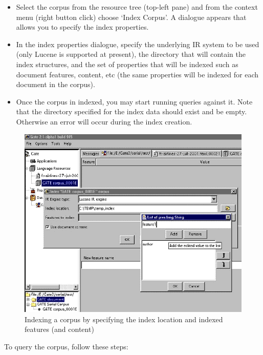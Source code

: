 \begin{itemize}
%
\item
Select the corpus from the resource tree (top-left pane) and from the
context menu (right button click) choose `Index Corpus'. A dialogue
appears that allows you to specify the index properties.
%
\item
In the index properties dialogue, specify the underlying IR system to
be used (only Lucene is supported at present), the directory that will
contain the index structures, and the set of properties that will be
indexed such as document features, content, etc (the same properties
will be indexed for each document in the corpus).
%
\item
Once the corpus in indexed, you may start running queries against
it. Note that the directory specified  for the index data should exist
and be empty. Otherwise an error will occur during the index creation.
%
\end{itemize}

%
\begin{figure}[htbp]
\begin{center}
\includegraphics[scale=0.5]{ir2.png}
\end{center}
\caption{Indexing a corpus by specifying the index location and
indexed features (and content)}
\label{fig:ir2}
\end{figure}
%



To query the corpus, follow these steps:

